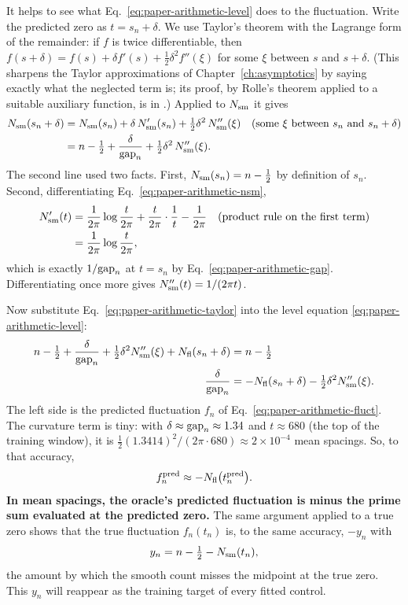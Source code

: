 It helps to see what Eq.~\eqref{eq:paper-arithmetic-level} does to the fluctuation. Write the predicted zero as $t=s_n+\delta$. We use Taylor's theorem with the Lagrange form of the remainder: if $f$ is twice differentiable, then $f(s+\delta)=f(s)+\delta f'(s)+\tfrac12\delta^2f''(\xi)$ for some $\xi$ between $s$ and $s+\delta$. (This sharpens the Taylor approximations of Chapter~\ref{ch:asymptotics} by saying exactly what the neglected term is; its proof, by Rolle's theorem applied to a suitable auxiliary function, is in \cite{rhb}.) Applied to $N_{\mathrm{sm}}$ it gives
\begin{align}
N_{\mathrm{sm}}(s_n+\delta) &= N_{\mathrm{sm}}(s_n) + \delta\,N_{\mathrm{sm}}'(s_n) + \tfrac12\delta^2\,N_{\mathrm{sm}}''(\xi)
\quad\text{(some $\xi$ between $s_n$ and $s_n+\delta$)}\nonumber\\
&= n-\tfrac12 + \frac{\delta}{\mathrm{gap}_n} + \tfrac12\delta^2\,N_{\mathrm{sm}}''(\xi).
\label{eq:paper-arithmetic-taylor}
\end{align}
The second line used two facts. First, $N_{\mathrm{sm}}(s_n)=n-\tfrac12$ by definition of $s_n$. Second, differentiating Eq.~\eqref{eq:paper-arithmetic-nsm},
\begin{align}
N_{\mathrm{sm}}'(t) &= \frac{1}{2\pi}\log\frac{t}{2\pi} + \frac{t}{2\pi}\cdot\frac{1}{t} - \frac{1}{2\pi}
\quad\text{(product rule on the first term)}\nonumber\\
&= \frac{1}{2\pi}\log\frac{t}{2\pi},
\label{eq:paper-arithmetic-nsmprime}
\end{align}
which is exactly $1/\mathrm{gap}_n$ at $t=s_n$ by Eq.~\eqref{eq:paper-arithmetic-gap}. Differentiating once more gives $N_{\mathrm{sm}}''(t)=1/(2\pi t)$.

Now substitute Eq.~\eqref{eq:paper-arithmetic-taylor} into the level equation \eqref{eq:paper-arithmetic-level}:
\begin{align}
n-\tfrac12 + \frac{\delta}{\mathrm{gap}_n} + \tfrac12\delta^2N_{\mathrm{sm}}''(\xi) + N_{\mathrm{fl}}(s_n+\delta) &= n-\tfrac12\nonumber\\
\frac{\delta}{\mathrm{gap}_n} &= -N_{\mathrm{fl}}(s_n+\delta) - \tfrac12\delta^2N_{\mathrm{sm}}''(\xi).
\label{eq:paper-arithmetic-exactfluct}
\end{align}
The left side is the predicted fluctuation $f_n$ of Eq.~\eqref{eq:paper-arithmetic-fluct}. The curvature term is tiny: with $\delta\approx\mathrm{gap}_n\approx1.34$ and $t\approx680$ (the top of the training window), it is $\tfrac12(1.3414)^2/(2\pi\cdot680)\approx 2\times10^{-4}$ mean spacings. So, to that accuracy,
\begin{equation}
f_n^{\rm pred} \approx -N_{\mathrm{fl}}\bigl(t_n^{\rm pred}\bigr).
\label{eq:paper-arithmetic-predfluct}
\end{equation}
\textbf{In mean spacings, the oracle's predicted fluctuation is minus the prime sum evaluated at the predicted zero.} The same argument applied to a true zero shows that the true fluctuation $f_n(t_n)$ is, to the same accuracy, $-y_n$ with
\begin{equation}
y_n = n-\tfrac12-N_{\mathrm{sm}}(t_n),
\label{eq:paper-arithmetic-yn}
\end{equation}
the amount by which the smooth count misses the midpoint at the true zero. This $y_n$ will reappear as the training target of every fitted control.

